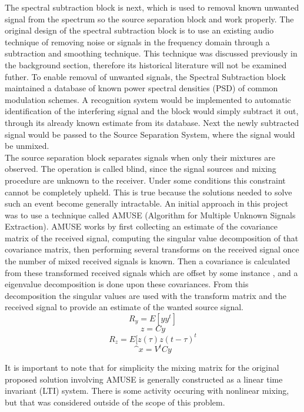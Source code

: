 The spectral subtraction block is next, which is used to removal known unwanted signal from the spectrum so the source separation block and work properly.  The original design of the spectral subtraction block is to use an existing audio technique of removing noise or signals in the frequency domain through a subtraction and smoothing technique.  This technique was discussed previously in the background section, therefore its historical literature will not be examined futher.  To enable removal of unwanted signals, the Spectral Subtraction block maintained a database of known power spectral densities (PSD) of common modulation schemes.  A recognition system would be implemented to automatic identification of the interfering signal and the block would simply subtract it out, through its already known estimate from its database.  Next the newly subtracted signal would be passed to the Source Separation System, where the signal would be unmixed.\\

The source separation block separates signals when only their mixtures are observed.  The operation is called blind, since the signal sources and mixing procedure are unknown to the receiver.  Under some conditions this constraint cannot be completely upheld.  This is true because the solutions needed to solve such an event become generally intractable.  An initial approach in this project was to use a technique called AMUSE (Algorithm for Multiple Unknown Signals Extraction)\cite{amuse}.  AMUSE works by first collecting an estimate of the covariance matrix of the received signal, computing the singular value decomposition of that covariance matrix, then performing several transforms on the received signal once the number of mixed received signals is known.  Then a covariance is calculated from these transformed received signals which are offset by some instance \tau, and a eigenvalue decomposition is done upon these covariances.  From this decomposition the singular values are used with the transform matrix and the received signal to provide an estimate of the wanted source signal.\\

\[ R_{y}=E[yy^{t}]\]
\[ z=Cy\]
\[ R_{z}=E[z(\tau)z(t-\tau)^{t}\]
\[\^{x}=V^{t}Cy\]

It is important to note that for simplicity the mixing matrix for the original proposed solution involving AMUSE is generally constructed as a linear time invariant (LTI) system.  There is some activity occuring with nonlinear mixing, but that was considered outside of the scope of this problem.\\

